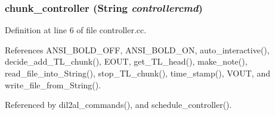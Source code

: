 \subsubsection{ chunk\_\-controller ({\bf String} {\em controllercmd})}\label{dil2al_8hh_a339}




Definition at line 6 of file controller.cc.

References ANSI\_\-BOLD\_\-OFF, ANSI\_\-BOLD\_\-ON, auto\_\-interactive(), decide\_\-add\_\-TL\_\-chunk(), EOUT, get\_\-TL\_\-head(), make\_\-note(), read\_\-file\_\-into\_\-String(), stop\_\-TL\_\-chunk(), time\_\-stamp(), VOUT, and write\_\-file\_\-from\_\-String().

Referenced by dil2al\_\-commands(), and schedule\_\-controller().



